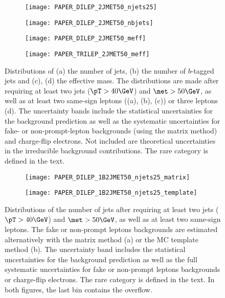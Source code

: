 \begin{figure}[th!]
\centering
\begin{subfigure}[t]{0.49\textwidth}\texttt{[image: PAPER\_DILEP\_2JMET50\_njets25]}\caption{}\label{fig:VRnj}\end{subfigure}
\begin{subfigure}[t]{0.49\textwidth}\texttt{[image: PAPER\_DILEP\_2JMET50\_nbjets]}\caption{}\label{fig:VRnb}\end{subfigure}
\begin{subfigure}[t]{0.49\textwidth}\texttt{[image: PAPER\_DILEP\_2JMET50\_meff]}\caption{}\label{fig:VRmeff1}\end{subfigure}
\begin{subfigure}[t]{0.49\textwidth}\texttt{[image: PAPER\_TRILEP\_2JMET50\_meff]}\caption{}\label{fig:VRmeff2}\end{subfigure}
\caption{
Distributions of (a) the number of jets, (b) the number of $b$-tagged jets and (c), (d) the effective mass. The distributions are made 
after requiring at least two jets ($\pT>40 \GeV$) and $\met>50 \GeV$, as well as at least two same-sign leptons ((a), (b), (c)) 
or three leptons (d). The uncertainty bands include the statistical uncertainties for the background prediction as well as the 
systematic uncertainties for fake- or non-prompt-lepton backgrounds (using the matrix method) and charge-flip electrons. Not included
are theoretical uncertainties in the irreducible background contributions.
The rare category is defined in the text.}
\label{fig:Bkg_distribs} 
\end{figure} 


\begin{figure}[htb!]
\begin{subfigure}[t]{0.49\textwidth}\texttt{[image: PAPER\_DILEP\_1B2JMET50\_njets25\_matrix]}\caption{}\label{fig:VR1b2j_MxM}\end{subfigure}
\begin{subfigure}[t]{0.49\textwidth}\texttt{[image: PAPER\_DILEP\_1B2JMET50\_njets25\_template]}\caption{}\label{fig:VR1b2j_MCT}\end{subfigure}
\caption{
Distributions of the number of jets after requiring at least two jets ($\pT> 40 \GeV$) and $\met> 50 \GeV$, 
as well as at least two same-sign leptons. 
The fake or non-prompt leptons backgrounds are estimated alternatively with the matrix method (a) or the MC template method (b). 
The uncertainty band includes the statistical uncertainties for the background prediction as well as the
full systematic uncertainties for fake or non-prompt leptons backgrounds or charge-flip electrons. 
The rare category is defined in the text. In both figures, the last bin contains the overflow.
}
\label{fig:VR1b2j}
\end{figure}

